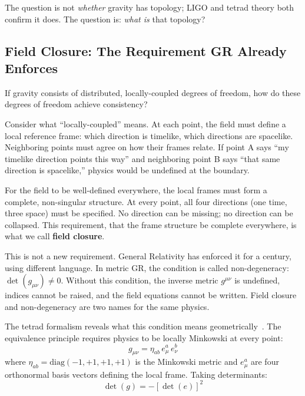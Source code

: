 \documentclass[aps,prd,preprint,superscriptaddress,showpacs,preprintnumbers,amsmath,amssymb,nofootinbib]{revtex4-2}
\begin{document}
The question is not \emph{whether} gravity has topology; LIGO and tetrad theory both confirm it does. The question is: \emph{what is} that topology?

\subsection{Field Closure: The Requirement GR Already Enforces}
\label{subsec:closure}

If gravity consists of distributed, locally-coupled degrees of freedom, how do these degrees of freedom achieve consistency?

Consider what ``locally-coupled'' means. At each point, the field must define a local reference frame: which direction is timelike, which directions are spacelike. Neighboring points must agree on how their frames relate. If point A says ``my timelike direction points this way'' and neighboring point B says ``that same direction is spacelike,'' physics would be undefined at the boundary.

For the field to be well-defined everywhere, the local frames must form a complete, non-singular structure. At every point, all four directions (one time, three space) must be specified. No direction can be missing; no direction can be collapsed. This requirement, that the frame structure be complete everywhere, is what we call \textbf{field closure}.

This is not a new requirement. General Relativity has enforced it for a century, using different language. In metric GR, the condition is called non-degeneracy: $\det(g_{\mu\nu}) \neq 0$. Without this condition, the inverse metric $g^{\mu\nu}$ is undefined, indices cannot be raised, and the field equations cannot be written. Field closure and non-degeneracy are two names for the same physics.

The tetrad formalism reveals what this condition means geometrically~\cite{mtw1973,wald1984}. The equivalence principle requires physics to be locally Minkowski at every point:
\begin{equation}
g_{\mu\nu} = \eta_{ab}\, e^a_\mu\, e^b_\nu
\label{eq:tetrad}
\end{equation}
where $\eta_{ab} = \text{diag}(-1, +1, +1, +1)$ is the Minkowski metric and $e^a_\mu$ are four orthonormal basis vectors defining the local frame. Taking determinants:
\begin{equation}
\det(g) = -[\det(e)]^2
\label{eq:det-relation}
\end{equation}
\end{document}
